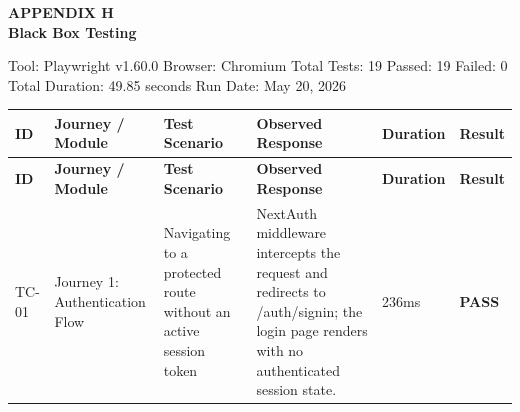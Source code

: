 \documentclass[12pt, letterpaper]{article}
\numberwithin{figure}{section}
\numberwithin{table}{section}
\begin{document}
\newpage
{}

\begin{center}
  \textbf{APPENDIX H} \\
  \vspace{0.5cm}
  \textbf{Black Box Testing}
\end{center}

\vspace{0.5cm}
\noindent
Tool: Playwright v1.60.0   Browser: Chromium   Total Tests: 19
Passed: 19   Failed: 0   Total Duration: 49.85 seconds   Run Date: May 20, 2026
\begin{center}
  \small
  \begin{singlespace}

    \begin{longtable}{|
        >{\raggedright\arraybackslash}p{}|
        >{\raggedright\arraybackslash}p{}|
        >{\raggedright\arraybackslash}p{}|
        >{\raggedright\arraybackslash}p{}|
        >{\raggedright\arraybackslash}p{}|
      >{\raggedright\arraybackslash}p{}|}

      \hline

      \rowcolor[gray]{0.9}
      \textbf{ID} & \textbf{Journey / Module} & \textbf{Test
      Scenario} & \textbf{Observed Response} & \textbf{Duration} &
      \textbf{Result} \\ \hline
      \endfirsthead

      \hline
      \rowcolor[gray]{0.9}
      \textbf{ID} & \textbf{Journey / Module} & \textbf{Test
      Scenario} & \textbf{Observed Response} & \textbf{Duration} &
      \textbf{Result} \\ \hline
      \endhead

      \hline
      \endfoot

      \hline
      \endlastfoot

      \rowcolor{white}
      TC-01 & Journey 1: Authentication Flow & Navigating to a
      protected route without an active session token & NextAuth
      middleware intercepts the request and redirects to
      /auth/signin; the login page renders with no authenticated
      session state. & 236ms & \cellcolor[gray]{0.9}\textbf{PASS} \\ \hline


\end{longtable}
\end{singlespace}
\end{center}
\end{document}
